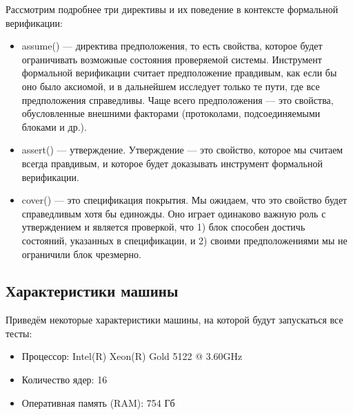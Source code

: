 Рассмотрим подробнее три директивы и их поведение в контексте формальной верификации: 

\begin{itemize}
    \item assume() --- директива предположения, то есть свойства, которое будет ограничивать возможные состояния проверяемой системы. Инструмент формальной верификации считает предположение правдивым, как если бы оно было аксиомой, и в дальнейшем исследует только те пути, где все предположения справедливы. Чаще всего предположения --- это свойства, обусловленные внешними факторами (протоколами, подсоединяемыми блоками и др.). 
    \item assert() --- утверждение. Утверждение --- это свойство, которое мы считаем всегда правдивым, и которое будет доказывать инструмент формальной верификации. 
    \item cover() --- это спецификация покрытия. Мы ожидаем, что это свойство будет справедливым хотя бы единожды. Оно играет одинаково важную роль с утверждением и является проверкой, что 1) блок способен достичь состояний, указанных в спецификации, и 2) своими предположениями мы не ограничили блок чрезмерно. 
\end{itemize}

\subsection{Характеристики машины}

Приведём некоторые характеристики машины, на которой будут запускаться все тесты: 

\begin{itemize}
	\item Процессор: Intel(R) Xeon(R) Gold 5122 @ 3.60GHz
	\item Количество ядер: 16
	\item Оперативная память (RAM): 754 Гб
\end{itemize}
